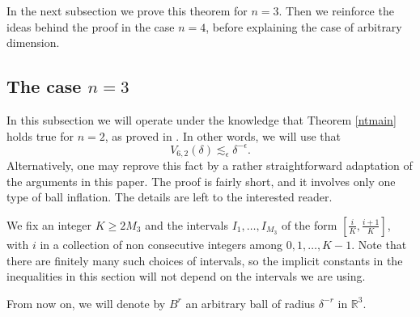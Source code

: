 \documentclass[amssymb,amsfonts,12pt]{amsart}
\def\R{{\mathbb R}}
\begin{document}
In the next subsection we prove this theorem for  $n=3$. Then we reinforce the ideas behind the proof in the case $n=4$, before explaining the case of arbitrary dimension.
\bigskip



\subsection{The case $n=3$}
\label{sub1}
In this subsection we will operate under the knowledge that Theorem \ref{ntmain} holds true for $n=2$, as proved in \cite{BD3}. In other words, we will use that
\begin{equation}
\label{ne50}
V_{6,2}(\delta)\lesssim_\epsilon \delta^{-\epsilon}.
\end{equation}
Alternatively, one may reprove this fact by a rather straightforward adaptation of the arguments in this paper. The proof is fairly short, and it involves only one type of ball inflation. The details are left to the interested reader.


We fix an integer $K\ge 2M_3$ and the intervals
$I_1,\ldots,I_{M_3}$ of the form $[\frac{i}{K},\frac{i+1}{K}]$, with $i$ in a collection of non consecutive integers among $0,1,\ldots,K-1$. Note that there are finitely many such choices of intervals, so the implicit constants in the inequalities in this section will not depend on the intervals we are using.

From now on, we will denote by $B^r$ an arbitrary ball of radius $\delta^{-r}$ in $\R^3$.
\end{document}

